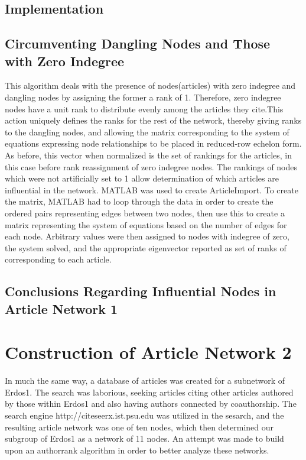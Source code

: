 \documentclass[12pt]{article} %
\begin{document}
    \subsection{Implementation}
    \subsection{Circumventing Dangling Nodes and Those with Zero Indegree}
      This algorithm deals with the presence of nodes(articles) with zero indegree and dangling nodes by assigning the former a rank of 1. Therefore, zero indegree nodes have a unit rank to distribute evenly among the articles they cite.This action uniquely defines the ranks for the rest of the network, thereby giving ranks to the dangling nodes, and allowing the matrix corresponding to the system of equations expressing node relationships to be placed in reduced-row echelon form. As before, this vector when normalized is the set of rankings for the articles, in this case before rank reassignment of zero indegree nodes. The rankings of nodes which were not artificially set to 1 allow determination of which articles are influential in the network. MATLAB was used to create ArticleImport. To create the matrix, MATLAB had to loop through the data in order to create the ordered pairs representing edges between two nodes, then use this to create a matrix representing the system of equations based on the number of edges for each node. Arbitrary values were then assigned to nodes with indegree of zero, the system solved, and the appropriate eigenvector reported as set of ranks of corresponding to each article.
    \subsection{Conclusions Regarding Influential Nodes in Article Network 1}
\section{Construction of Article Network 2}
In much the same way, a database of articles was created for a subnetwork of Erdos1. The search was laborious, seeking articles citing other articles authored by those within Erdos1 and also having authors connected by coauthorship. The search engine http://citeseerx.ist.psu.edu was utilized in the sesarch, and the resulting article network was one of ten nodes, which then determined our subgroup of Erdos1 as a network of 11 nodes. An attempt was made to build upon an authorrank algorithm in order to better analyze these networks.
\end{document}
